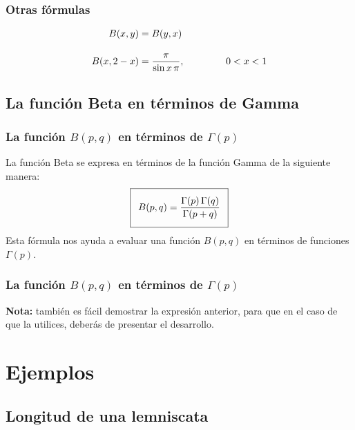 \documentclass[12pt]{beamer}
\begin{document}
\begin{frame}
\frametitle{Otras fórmulas}
\begin{align*}
B (x, y) &= B (y, x) \\[1em]
B (x, 2-x) &= \dfrac{\pi}{\sin x \, \pi}, \hspace{1.5cm} 0 < x < 1   
\end{align*}
\end{frame}

\subsection{La función Beta en términos de Gamma}

\begin{frame}
\frametitle{La función $B(p, q)$ en términos de $\Gamma (p)$}
La función Beta se expresa en términos de la función Gamma de la siguiente manera:
\begin{align}
\addtolength{\fboxsep}{5pt}\boxed{B(p, q) = \dfrac{\Gamma(p) \, \Gamma(q)}{\Gamma (p + q)}}
\label{eq:ecuacion_07_01}
\end{align}
Esta fórmula nos ayuda a evaluar una función $B (p, q)$ en términos de funciones $\Gamma (p)$.
\end{frame}
\begin{frame}
\frametitle{La función $B(p, q)$ en términos de $\Gamma (p)$}
\textbf{Nota: } también es fácil demostrar la expresión anterior, para que en el caso de que la utilices, deberás de presentar el desarrollo.
\end{frame}

\section{Ejemplos}
\subsection{Longitud de una lemniscata}
\end{document}

